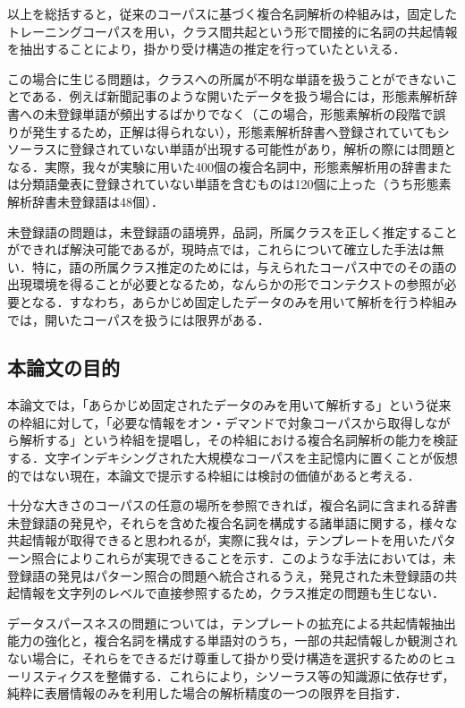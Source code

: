 以上を総括すると，従来のコーパスに基づく複合名詞解析の枠組みは，固定したトレーニングコーパスを用い，クラス間共起という形で間接的に名詞の共起情報を抽出することにより，掛かり受け構造の推定を行っていたといえる．

この場合に生じる問題は，クラスへの所属が不明な単語を扱うことができないことである．例えば新聞記事のような開いたデータを扱う場合には，形態素解析辞書への未登録単語が頻出するばかりでなく（この場合，形態素解析の段階で誤りが発生するため，正解は得られない），形態素解析辞書へ登録されていてもシソーラスに登録されていない単語が出現する可能性があり，解析の際には問題となる．実際，我々が実験に用いた400個の複合名詞中，形態素解析用の辞書または分類語彙表に登録されていない単語を含むものは120個に上った（うち形態素解析辞書未登録語は48個）．

未登録語の問題は，未登録語の語境界，品詞，所属クラスを正しく推定することができれば解決可能であるが，現時点では，これらについて確立した手法は無い．特に，語の所属クラス推定のためには，与えられたコーパス中でのその語の出現環境を得ることが必要となるため，なんらかの形でコンテクストの参照が必要となる．すなわち，あらかじめ固定したデータのみを用いて解析を行う枠組みでは，開いたコーパスを扱うには限界がある．

\subsection{本論文の目的}\label{本論文の目的}
本論文では，「あらかじめ固定されたデータのみを用いて解析する」という従来の枠組に対して，「必要な情報をオン・デマンドで対象コーパスから取得しながら解析する」という枠組を提唱し，その枠組における複合名詞解析の能力を検証する．文字インデキシングされた大規模なコーパスを主記憶内に置くことが仮想的ではない現在，本論文で提示する枠組には検討の価値があると考える．

十分な大きさのコーパスの任意の場所を参照できれば，複合名詞に含まれる辞書未登録語の発見や，それらを含めた複合名詞を構成する諸単語に関する，様々な共起情報が取得できると思われるが，実際に我々は，テンプレートを用いたパターン照合によりこれらが実現できることを示す．このような手法においては，未登録語の発見はパターン照合の問題へ統合されるうえ，発見された未登録語の共起情報を文字列のレベルで直接参照するため，クラス推定の問題も生じない．

データスパースネスの問題については，テンプレートの拡充による共起情報抽出能力の強化と，複合名詞を構成する単語対のうち，一部の共起情報しか観測されない場合に，それらをできるだけ尊重して掛かり受け構造を選択するためのヒューリスティクスを整備する．これらにより，シソーラス等の知識源に依存せず，純粋に表層情報のみを利用した場合の解析精度の一つの限界を目指す．

